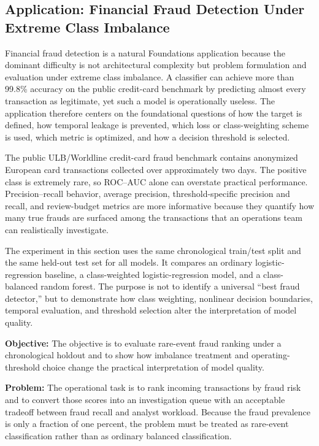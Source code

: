 \subsection{Application: Financial Fraud Detection Under Extreme Class Imbalance}

Financial fraud detection is a natural Foundations application because the dominant difficulty is not architectural complexity but problem formulation and evaluation under extreme class imbalance. A classifier can achieve more than 99.8\% accuracy on the public credit-card benchmark by predicting almost every transaction as legitimate, yet such a model is operationally useless. The application therefore centers on the foundational questions of how the target is defined, how temporal leakage is prevented, which loss or class-weighting scheme is used, which metric is optimized, and how a decision threshold is selected.

The public ULB/Worldline credit-card fraud benchmark contains anonymized European card transactions collected over approximately two days. The positive class is extremely rare, so ROC--AUC alone can overstate practical performance. Precision--recall behavior, average precision, threshold-specific precision and recall, and review-budget metrics are more informative because they quantify how many true frauds are surfaced among the transactions that an operations team can realistically investigate.

The experiment in this section uses the same chronological train/test split and the same held-out test set for all models. It compares an ordinary logistic-regression baseline, a class-weighted logistic-regression model, and a class-balanced random forest. The purpose is not to identify a universal ``best fraud detector,'' but to demonstrate how class weighting, nonlinear decision boundaries, temporal evaluation, and threshold selection alter the interpretation of model quality.

\textbf{Objective:} The objective is to evaluate rare-event fraud ranking under a chronological holdout and to show how imbalance treatment and operating-threshold choice change the practical interpretation of model quality.

\textbf{Problem:} The operational task is to rank incoming transactions by fraud risk and to convert those scores into an investigation queue with an acceptable tradeoff between fraud recall and analyst workload. Because the fraud prevalence is only a fraction of one percent, the problem must be treated as rare-event classification rather than as ordinary balanced classification.

